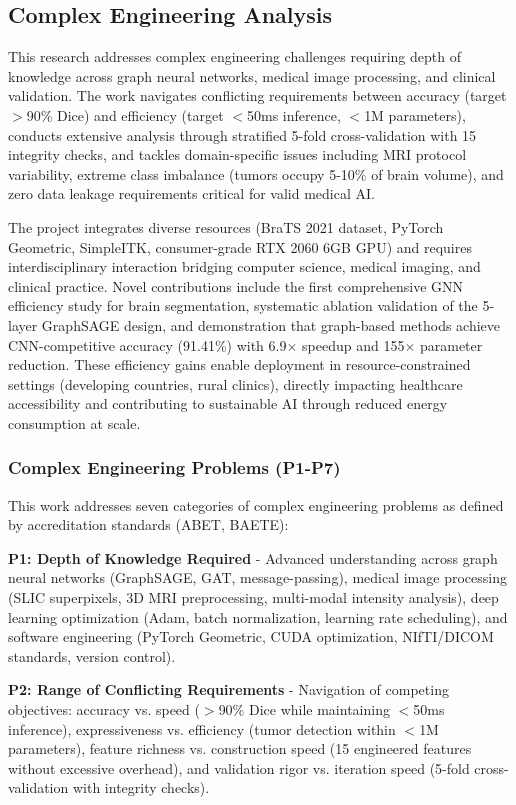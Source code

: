\subsection{Complex Engineering Analysis}

This research addresses complex engineering challenges requiring depth of knowledge across graph neural networks, medical image processing, and clinical validation. The work navigates conflicting requirements between accuracy (target $>$90\% Dice) and efficiency (target $<$50ms inference, $<$1M parameters), conducts extensive analysis through stratified 5-fold cross-validation with 15 integrity checks, and tackles domain-specific issues including MRI protocol variability, extreme class imbalance (tumors occupy 5-10\% of brain volume), and zero data leakage requirements critical for valid medical AI.

The project integrates diverse resources (BraTS 2021 dataset, PyTorch Geometric, SimpleITK, consumer-grade RTX 2060 6GB GPU) and requires interdisciplinary interaction bridging computer science, medical imaging, and clinical practice. Novel contributions include the first comprehensive GNN efficiency study for brain segmentation, systematic ablation validation of the 5-layer GraphSAGE design, and demonstration that graph-based methods achieve CNN-competitive accuracy (91.41\%) with 6.9$\times$ speedup and 155$\times$ parameter reduction. These efficiency gains enable deployment in resource-constrained settings (developing countries, rural clinics), directly impacting healthcare accessibility and contributing to sustainable AI through reduced energy consumption at scale.

\subsubsection{Complex Engineering Problems (P1-P7)}

This work addresses seven categories of complex engineering problems as defined by accreditation standards (ABET, BAETE):

\textbf{P1: Depth of Knowledge Required} - Advanced understanding across graph neural networks (GraphSAGE, GAT, message-passing), medical image processing (SLIC superpixels, 3D MRI preprocessing, multi-modal intensity analysis), deep learning optimization (Adam, batch normalization, learning rate scheduling), and software engineering (PyTorch Geometric, CUDA optimization, NIfTI/DICOM standards, version control).

\textbf{P2: Range of Conflicting Requirements} - Navigation of competing objectives: accuracy vs. speed ($>$90\% Dice while maintaining $<$50ms inference), expressiveness vs. efficiency (tumor detection within $<$1M parameters), feature richness vs. construction speed (15 engineered features without excessive overhead), and validation rigor vs. iteration speed (5-fold cross-validation with integrity checks).

